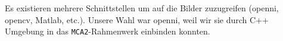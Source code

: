 


Es existieren mehrere Schnittstellen um auf die Bilder zuzugreifen (\gls{openni}, \gls{opencv}, Matlab, etc.).
 Unsere Wahl war \gls{openni}, weil wir sie durch C++ Umgebung in das
 \lstinline{MCA2}-Rahmenwerk einbinden konnten.

